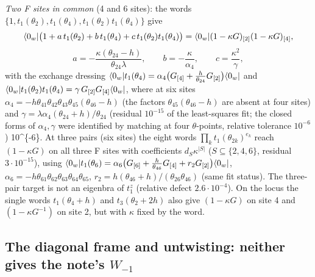 \emph{Two F sites in common} (4 and 6 sites): the words $\{1,t_1(\theta_2),t_1(\theta_4),t_1(\theta_2)t_1(\theta_4)\}$ give
\begin{equation}
 \langle0_w|\big(1+a\,t_1(\theta_2)+b\,t_1(\theta_4)+c\,t_1(\theta_2)t_1(\theta_4)\big)=\langle0_w|(1-\kappa G)_{[2]}(1-\kappa G)_{[4]},
\end{equation}
\begin{equation}
 a=-\frac{\kappa(\theta_{24}-h)}{\theta_{24}\lambda},\qquad b=-\frac\kappa{\alpha_4},\qquad c=\frac{\kappa^2}\gamma,
\end{equation}
with the exchange dressing $\langle0_w|t_1(\theta_4)=\alpha_4\big(G_{[4]}+\frac h{\theta_{24}}G_{[2]}\big)\langle0_w|$ and $\langle0_w|t_1(\theta_2)t_1(\theta_4)=\gamma\,G_{[2]}G_{[4]}\langle0_w|$, where
at six sites $\alpha_4=-h\theta_{41}\theta_{42}\theta_{43}\theta_{45}(\theta_{46}-h)$ (the factors $\theta_{45}(\theta_{46}-h)$ are absent at four sites) and
$\gamma=\lambda\alpha_4(\theta_{24}+h)/\theta_{24}$ (residual $10^{-15}$ of the least-squares fit; the closed forms of $\alpha_4,\gamma$ were identified by matching at four $\theta$-points, relative tolerance $10^{-6}$)
\num{10^{-6}}. At three pairs (six sites) the eight words $\prod_kt_1(\theta_{2k})^{e_k}$ reach $(1-\kappa G)$ on all three F sites with coefficients $d_S\kappa^{|S|}$ ($S\subseteq\{2,4,6\}$, residual $3\cdot10^{-15}$),
using $\langle0_w|t_1(\theta_6)=\alpha_6\big(G_{[6]}+\frac h{\theta_{46}}G_{[4]}+r_2G_{[2]}\big)\langle0_w|$, $\alpha_6=-h\theta_{61}\theta_{62}\theta_{63}\theta_{64}\theta_{65}$, $r_2=h(\theta_{46}+h)/(\theta_{26}\theta_{46})$
(same fit status). The three-pair target is not an eigenbra of $t_1^z$ (relative defect $2.6\cdot10^{-4}$). On the locus the single words $t_1(\theta_4+h)$ and $t_3(\theta_2+2h)$ also give $(1-\kappa G)$ on site 4 and
$(1-\kappa G^{-1})$ on site 2, but with $\kappa$ fixed by the word.

\subsection{The diagonal frame and untwisting: neither gives the note's \texorpdfstring{$W_{-1}$}{W\_{-1}}}\label{sec:twvac-diag}

